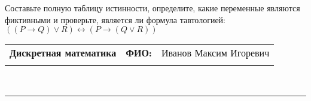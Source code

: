 \documentclass[10pt]{exam}
\newcommand{\class}{Дискретная математика}
\newcommand{\examdate}{}
\begin{document}
\begin{questions}
\begin{enumerate} [a)]
\end{enumerate}\question Составьте полную таблицу истинности, определите, какие переменные являются фиктивными и проверьте, является ли формула тавтологией:
$((P \rightarrow Q) \lor R) \leftrightarrow (P \rightarrow (Q \lor R))$

\end{questions}
\newpage
\begin{flushright}
\begin{tabular}{p{2.8in} r l}
\textbf{\class} & \textbf{ФИО:} &Иванов Максим Игоревич
\\

\textbf{\examdate} &&\\
\end{tabular}\\
\end{flushright}
\rule[1ex]{\textwidth}{.1pt}
\end{document}
